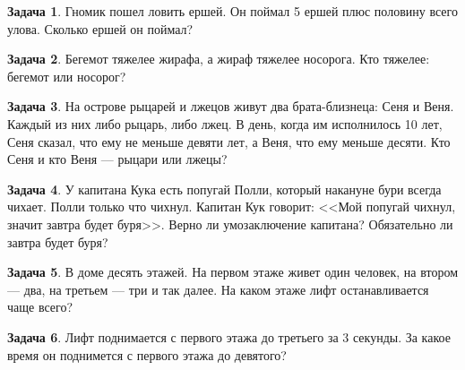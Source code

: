 \documentclass[14pt, a4paper]{extarticle}
\theoremstyle{definition}
\newtheorem{task}{Задача}
\begin{document}
\begin{task}
   Гномик пошел ловить ершей. Он поймал 5 ершей плюс половину всего улова. Сколько ершей он поймал?
\end{task}

\begin{task}
    Бегемот тяжелее жирафа, а жираф тяжелее носорога. Кто тяжелее: бегемот или носорог?
\end{task}

\begin{task}
На острове рыцарей и лжецов живут два брата-близнеца: Сеня и Веня. Каждый из них
либо рыцарь, либо лжец. В день, когда им исполнилось 10 лет, Сеня сказал, что 
ему не меньше девяти лет, а Веня, что ему меньше десяти. Кто Сеня и кто Веня --- рыцари
или лжецы?
\end{task}

\begin{task}
У капитана Кука есть попугай Полли, который накануне бури всегда чихает. Полли только что чихнул.
Капитан Кук говорит: <<Мой попугай чихнул, значит завтра будет буря>>.
Верно ли умозаключение капитана? Обязательно ли завтра будет буря?
\end{task}

\begin{task}
   В доме десять этажей. На первом этаже живет один человек, на втором --- два, на третьем --- три
   и так далее. На каком этаже лифт останавливается чаще всего?
\end{task}

\begin{task}
    Лифт поднимается с первого этажа до третьего за 3 секунды. За какое время он поднимется с первого этажа до девятого?
\end{task}
\end{document}
